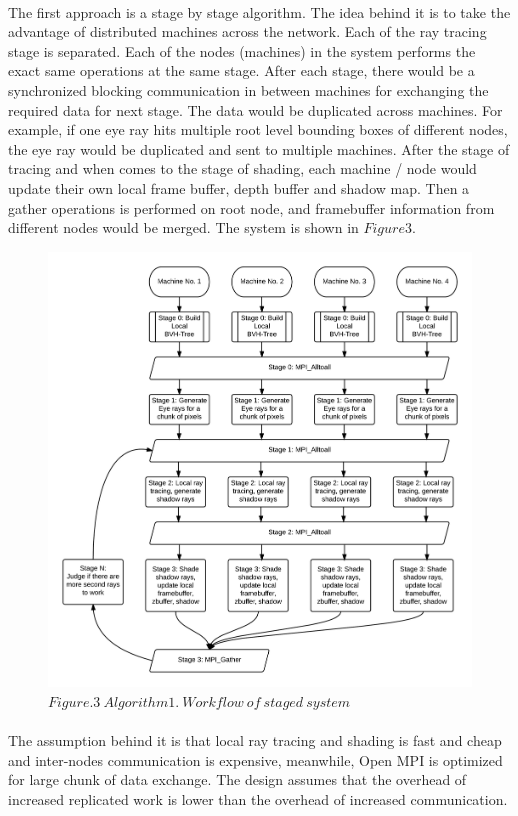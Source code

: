 \documentclass[a4paper, oneside, 10pt]{article}
\begin{document}
\paragraph{}The first approach is a stage by stage algorithm. The idea behind it is to take the advantage of distributed machines across the network. Each of the ray tracing stage is separated. Each of the nodes (machines) in the system performs the exact same operations at the same stage. After each stage, there would be a synchronized blocking communication in between machines for exchanging the required data for next stage. The data would be duplicated across machines. For example, if one eye ray hits multiple root level bounding boxes of different nodes, the eye ray would be duplicated and sent to multiple machines. 
After the stage of tracing and when comes to the stage of shading, each machine / node would update their own local frame buffer, depth buffer and shadow map. Then a gather operations is performed on root node, and framebuffer information from different nodes would be merged.
The system is shown in $Figure 3$.
\begin{figure}[h]
\includegraphics[width=\textwidth]{algo1}
$Figure. 3\ Algorithm 1.\ Workflow\ of\ staged\ system$
\end{figure}
\paragraph{}The assumption behind it is that local ray tracing and shading is fast and cheap and inter-nodes communication is expensive, meanwhile, Open MPI is optimized for large chunk of data exchange. The design assumes that the overhead of increased replicated work is lower than the overhead of increased communication.
\end{document}
